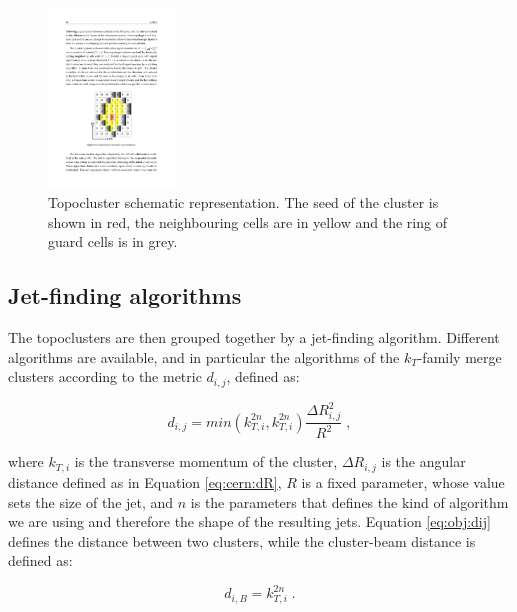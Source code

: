 \begin{figure}[h]
\begin{center}
\includegraphics[width=0.3\textwidth]{./figures/objects/topocluster.pdf}
\end{center}
\caption[Topocluster schematic representation]{Topocluster schematic representation. The seed of the cluster is shown in red, the neighbouring cells are in yellow and the ring of guard cells is in grey.}
\label{fig:obj:topocluster}
\end{figure}
 
\subsection{Jet-finding algorithms}
\label{sec:obj:jetfinding}

The topoclusters are then grouped together by a jet-finding algorithm. Different algorithms are available, and in particular the algorithms of the $k_T$-family merge clusters according to the metric $d_{i,j}$, defined as:

\begin{equation}
d_{i,j} = min\left( k_{T,i}^{2n}, k_{T,i}^{2n}  \right) \frac{\Delta R_{i,j}^2}{R^2} \; ,
\label{eq:obj:dij}
\end{equation}

\noindent where $k_{T,i}$ is the transverse momentum of the cluster, $\Delta R_{i,j}$ is the angular distance defined as in Equation \ref{eq:cern:dR}, 
$R$ is a fixed parameter, whose value sets the size of the jet, and $n$ is the parameters that defines the kind of algorithm we are using 
and therefore the shape of the resulting jets. 
Equation \ref{eq:obj:dij} defines the distance between two clusters, while the cluster-beam distance is defined as:

\begin{equation}
d_{i,B} =  k_{T,i}^{2n} \; . \nonumber
\end{equation}

